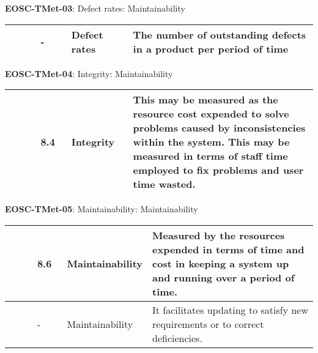 \textbf{EOSC-TMet-03}: Defect rates: Maintainability
\nopagebreak[4]
\begin{center}
    \tabletail{\hline}
    \tiny
    \begin{supertabular}{|p{0.10\linewidth}|p{0.10\linewidth}|p{0.20\linewidth}|p{0.60\linewidth}|} \hline
        \cite{crispin_driving_2006} & - & Defect rates & The number of outstanding defects in a product per period of time\\ \hline
    \end{supertabular}
\end{center}

\textbf{EOSC-TMet-04}: Integrity: Maintainability
\nopagebreak[4]
\begin{center}
    \tabletail{\hline}
    \tiny
    \begin{supertabular}{|p{0.10\linewidth}|p{0.10\linewidth}|p{0.20\linewidth}|p{0.60\linewidth}|} \hline
        \cite{gillies_modelling_1992} & 8.4 & Integrity & This may be measured as the resource cost expended to solve problems caused by inconsistencies within the system. This may be measured in terms of staff time employed to fix problems and user time wasted.\\ \hline
    \end{supertabular}
\end{center}

\textbf{EOSC-TMet-05}: Maintainability: Maintainability
\nopagebreak[4]
\begin{center}
    \tabletail{\hline}
    \tiny
    \begin{supertabular}{|p{0.10\linewidth}|p{0.10\linewidth}|p{0.20\linewidth}|p{0.60\linewidth}|} \hline
        \cite{gillies_modelling_1992} & 8.6 & Maintainability & Measured by the resources expended in terms of time and cost in keeping a system up and running over a period of time.\\ \hline
        \cite{boehm_quantitative_1976} & - & Maintainability & It facilitates updating to satisfy new requirements or to correct deficiencies.\\ \hline
    \end{supertabular}
\end{center}

